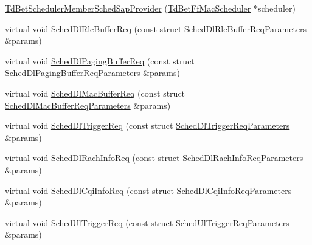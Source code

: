 \begin{DoxyCompactItemize}
\item 
\hyperlink{classns3_1_1TdBetSchedulerMemberSchedSapProvider_a73777b32c4477119dd54120dbbb42e24}{Td\+Bet\+Scheduler\+Member\+Sched\+Sap\+Provider} (\hyperlink{classns3_1_1TdBetFfMacScheduler}{Td\+Bet\+Ff\+Mac\+Scheduler} $\ast$scheduler)
\item 
virtual void \hyperlink{classns3_1_1TdBetSchedulerMemberSchedSapProvider_a0b2c46318b5795d2bee76fb3accf8a82}{Sched\+Dl\+Rlc\+Buffer\+Req} (const struct \hyperlink{structns3_1_1FfMacSchedSapProvider_1_1SchedDlRlcBufferReqParameters}{Sched\+Dl\+Rlc\+Buffer\+Req\+Parameters} \&params)
\item 
virtual void \hyperlink{classns3_1_1TdBetSchedulerMemberSchedSapProvider_a4e77a625704d04d66f24481f9a2d3805}{Sched\+Dl\+Paging\+Buffer\+Req} (const struct \hyperlink{structns3_1_1FfMacSchedSapProvider_1_1SchedDlPagingBufferReqParameters}{Sched\+Dl\+Paging\+Buffer\+Req\+Parameters} \&params)
\item 
virtual void \hyperlink{classns3_1_1TdBetSchedulerMemberSchedSapProvider_ad6f8239ad0e8c11b420831dc86ff2e2a}{Sched\+Dl\+Mac\+Buffer\+Req} (const struct \hyperlink{structns3_1_1FfMacSchedSapProvider_1_1SchedDlMacBufferReqParameters}{Sched\+Dl\+Mac\+Buffer\+Req\+Parameters} \&params)
\item 
virtual void \hyperlink{classns3_1_1TdBetSchedulerMemberSchedSapProvider_ae471ac31587dc6c0a3f23a21e111c637}{Sched\+Dl\+Trigger\+Req} (const struct \hyperlink{structns3_1_1FfMacSchedSapProvider_1_1SchedDlTriggerReqParameters}{Sched\+Dl\+Trigger\+Req\+Parameters} \&params)
\item 
virtual void \hyperlink{classns3_1_1TdBetSchedulerMemberSchedSapProvider_ae309566ca27a1e7575d1edebb64d26eb}{Sched\+Dl\+Rach\+Info\+Req} (const struct \hyperlink{structns3_1_1FfMacSchedSapProvider_1_1SchedDlRachInfoReqParameters}{Sched\+Dl\+Rach\+Info\+Req\+Parameters} \&params)
\item 
virtual void \hyperlink{classns3_1_1TdBetSchedulerMemberSchedSapProvider_a9e35672df5cf28dd27585d844e501e39}{Sched\+Dl\+Cqi\+Info\+Req} (const struct \hyperlink{structns3_1_1FfMacSchedSapProvider_1_1SchedDlCqiInfoReqParameters}{Sched\+Dl\+Cqi\+Info\+Req\+Parameters} \&params)
\item 
virtual void \hyperlink{classns3_1_1TdBetSchedulerMemberSchedSapProvider_a38572f1650745d4b678d43da35d734ec}{Sched\+Ul\+Trigger\+Req} (const struct \hyperlink{structns3_1_1FfMacSchedSapProvider_1_1SchedUlTriggerReqParameters}{Sched\+Ul\+Trigger\+Req\+Parameters} \&params)

\end{DoxyCompactItemize}
